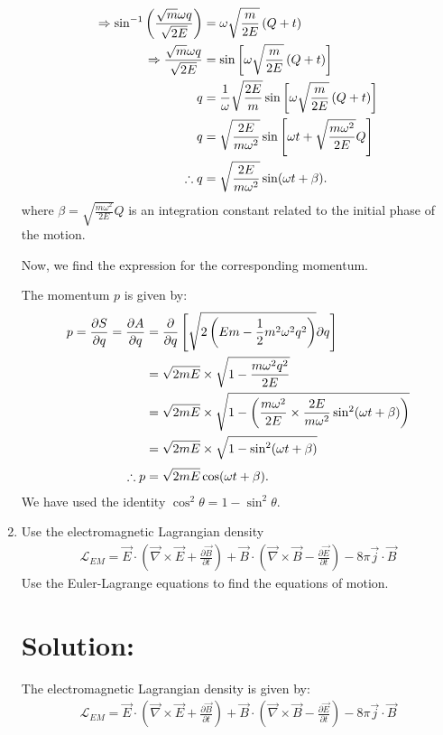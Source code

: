 \begin{enumerate}
\begin{align}
    \Rightarrow\sin^{-1}\left({\frac{\sqrt{m}\omega q}{\sqrt{2E}}}\right)&={\omega}\sqrt{\frac{m}{2E}}\left(Q+t\right)\notag\\
    \Rightarrow{\frac{\sqrt{m}\omega q}{\sqrt{2E}}}&=\sin\left[{\omega}\sqrt{\frac{m}{2E}}\left(Q+t\right)\right]\notag\\
    q&=\frac{1}{\omega}\sqrt{\frac{2E}{m}}\sin\left[{\omega}\sqrt{\frac{m}{2E}}\left(Q+t\right)\right]\notag\\
    q&=\sqrt{\frac{2E}{m\omega^2}}\sin\left[\omega t+\sqrt{\frac{m\omega^2}{2E}}Q\right]\notag\\
    \therefore q&=\sqrt{\frac{2E}{m\omega^2}} \sin(\omega t + \beta).
\end{align}
where $\displaystyle\beta = \sqrt{\frac{m\omega^2}{2E}}Q$ is an integration constant related to the initial phase of the motion.

Now, we find the expression for the corresponding momentum.

The momentum $p$ is given by:
\begin{align*}
    p = \frac{\partial S}{\partial q} = \frac{\partial A}{\partial q} &= \frac{\partial}{\partial q}\left[\sqrt{2\left(Em-\frac{1}{2}m^2\omega^2q^2\right)}\partial q\right]\notag\\
    &=\sqrt{2mE}\times\sqrt{1 - \frac{m\omega^2q^2}{2E}}\notag\\
    &=\sqrt{2mE}\times\sqrt{1 - \left(\frac{m\omega^2}{2E}\times\frac{2E}{m\omega^2}\sin^2(\omega t + \beta)\right)}\notag\\
    &=\sqrt{2mE}\times\sqrt{1 - \sin^2(\omega t + \beta)}\notag\\[3pt]
    \therefore p&=\sqrt{2mE}\cos(\omega t + \beta).
\end{align*}
We have used the identity $\cos^2\theta=1-\sin^2\theta$.
\bigskip\bigskip\hline\hline\bigskip

\item Use the electromagnetic Lagrangian density
        \begin{align*}
        \mathcal{L}_{EM} = \vec{E} \cdot \left(\vec{\nabla} \times \vec{E} + \frac{\partial \vec{B}}{\partial t}\right) + \vec{B} \cdot \left(\vec{\nabla} \times \vec{B} - \frac{\partial \vec{E}}{\partial t}\right) - 8\pi \vec{j} \cdot \vec{B}
        \end{align*}
        Use the Euler-Lagrange equations to find the equations of motion.
        \bigskip\bigskip\hline\hline\bigskip
\section*{Solution:}
The electromagnetic Lagrangian density is given by:
\begin{align}
    \mathcal{L}_{EM} = \vec{E} \cdot \left( \vec{\nabla} \times \vec{E} + \frac{\partial \vec{B}}{\partial t} \right) + \vec{B} \cdot \left( \vec{\nabla} \times \vec{B} - \frac{\partial \vec{E}}{\partial t} \right) - 8\pi \vec{j} \cdot \vec{B}\label{eq:em-lagrangian}
\end{align}


\end{enumerate}
